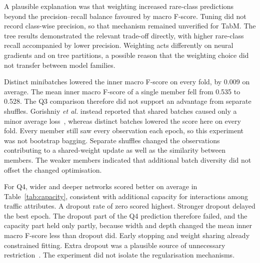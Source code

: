 \documentclass[conference]{IEEEtran}
\begin{document}
A plausible explanation was that weighting increased rare-class predictions beyond the precision--recall balance favoured by macro F-score. Tuning did not record class-wise precision, so that mechanism remained unverified for TabM. The tree results demonstrated the relevant trade-off directly, with higher rare-class recall accompanied by lower precision. Weighting acts differently on neural gradients and on tree partitions, a possible reason that the weighting choice did not transfer between model families.

Distinct minibatches lowered the inner macro F-score on every fold, by 0.009 on average. The mean inner macro F-score of a single member fell from 0.535 to 0.528. The Q3 comparison therefore did not support an advantage from separate shuffles. Gorishniy \emph{et al.} instead reported that shared batches caused only a minor average loss~\cite{gorishniy2025}, whereas distinct batches lowered the score here on every fold. Every member still saw every observation each epoch, so this experiment was not bootstrap bagging. Separate shuffles changed the observations contributing to a shared-weight update as well as the similarity between members. The weaker members indicated that additional batch diversity did not offset the changed optimisation.

For Q4, wider and deeper networks scored better on average in Table~\ref{tab:capacity}, consistent with additional capacity for interactions among traffic attributes. A dropout rate of zero scored highest. Stronger dropout delayed the best epoch. The dropout part of the Q4 prediction therefore failed, and the capacity part held only partly, because width and depth changed the mean inner macro F-score less than dropout did. Early stopping and weight sharing already constrained fitting. Extra dropout was a plausible source of unnecessary restriction~\cite{goodfellow2016,gorishniy2025}. The experiment did not isolate the regularisation mechanisms.
\end{document}
